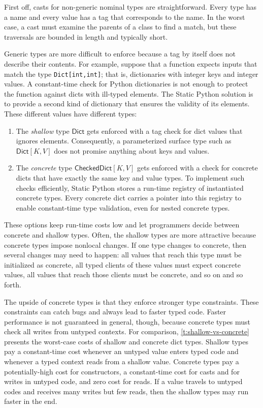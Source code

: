 \documentclass[english,cleveref,submission]{programming}
\newcommand{\SP}{Static Python}
\newcommand{\code}[1]{\texttt{#1}}
\newcommand{\typefont}[1]{\mathsf{#1}}
\newcommand{\paramtype}[2]{#1[#2]}
\newcommand{\sptrawpydict}{\typefont{Dict}}
\newcommand{\sptrawchkdict}{\typefont{CheckedDict}} %
\newcommand{\sptpydict}[2]{\paramtype{\sptrawpydict}{#1, #2}}
\newcommand{\sptchkdict}[2]{\paramtype{\sptrawchkdict}{#1, #2}}
\begin{document}
First off, casts for non-generic nominal types are straightforward.
Every type has a name and every value has a tag that corresponds to the name.
In the worst case, a cast must examine the parents of a class to find a match,
but these traversals are bounded in length and typically short.

Generic types are more difficult to enforce because a tag by itself does not
describe their contents.
For example, suppose that a function expects inputs that match
the type \code{Dict[int,int]}; that is, dictionaries with integer keys and
integer values.
A constant-time check for Python dictionaries is not enough to protect the
function against dicts with ill-typed elements.
The \SP{} solution is to provide a second kind of dictionary that ensures
the validity of its elements.
These different values have different types:
\begin{enumerate}
  \item
    The \emph{shallow} type $\sptrawpydict$ gets enforced with a tag check
    for dict values that ignores elements.
    Consequently, a parameterized surface type such as $\sptpydict{K}{V}$
    does not promise anything about keys and values.
  \item
    The \emph{concrete} type $\sptchkdict{K}{V}$ gets enforced with a
    check for concrete dicts that have exactly the same key and value
    types.
    To implement such checks efficiently, \SP{} stores a run-time registry
    of instantiated concrete types.
    Every concrete dict carries a pointer into this registry to enable
    constant-time type validation, even for nested concrete types.
\end{enumerate}
%
These options keep run-time costs low and let programmers decide between
concrete and shallow types.
Often, the shallow types are more attractive because concrete types impose
nonlocal changes.
If one type changes to concrete, then several changes may need to happen:
all values that reach this type must be initialized as concrete,
all typed clients of these values must expect concrete values,
all values that reach those clients must be concrete,
and so on and so forth.

The upside of concrete types is that they enforce stronger type constraints.
These constraints can catch bugs and always lead to faster typed code.
Faster performance is not guaranteed in general, though, because concrete types must
check all writes from untyped contexts.
For comparison, \cref{t:shallow-vs-concrete} presents the worst-case costs of
shallow and concrete dict types.
Shallow types pay a constant-time cost whenever an untyped value enters typed code
and whenever a typed context reads from a shallow value.
Concrete types pay a potentially-high cost for constructors,
a constant-time cost for casts and for writes in untyped code,
and zero cost for reads.
If a value travels to untyped codes and receives many writes but few reads,
then the shallow types may run faster in the end.
\end{document}
